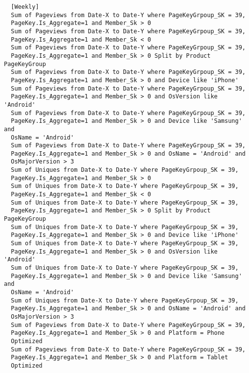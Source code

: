 \begin{verbatim}
  [Weekly]
  Sum of Pageviews from Date-X to Date-Y where PageKeyGrpoup_SK = 39,
  PageKey.Is_Aggregate=1 and Member_Sk > 0
  Sum of Pageviews from Date-X to Date-Y where PageKeyGrpoup_SK = 39,
  PageKey.Is_Aggregate=1 and Member_Sk < 0
  Sum of Pageviews from Date-X to Date-Y where PageKeyGrpoup_SK = 39,
  PageKey.Is_Aggregate=1 and Member_Sk > 0 Split by Product PageKeyGroup
  Sum of Pageviews from Date-X to Date-Y where PageKeyGrpoup_SK = 39,
  PageKey.Is_Aggregate=1 and Member_Sk > 0 and Device like 'iPhone'
  Sum of Pageviews from Date-X to Date-Y where PageKeyGrpoup_SK = 39,
  PageKey.Is_Aggregate=1 and Member_Sk > 0 and OsVersion like 'Android'
  Sum of Pageviews from Date-X to Date-Y where PageKeyGrpoup_SK = 39,
  PageKey.Is_Aggregate=1 and Member_Sk > 0 and Device like 'Samsung' and
  OsName = 'Android'
  Sum of Pageviews from Date-X to Date-Y where PageKeyGrpoup_SK = 39,
  PageKey.Is_Aggregate=1 and Member_Sk > 0 and OsName = 'Android' and
  OsMajorVersion > 3
  Sum of Uniques from Date-X to Date-Y where PageKeyGrpoup_SK = 39,
  PageKey.Is_Aggregate=1 and Member_Sk > 0
  Sum of Uniques from Date-X to Date-Y where PageKeyGrpoup_SK = 39,
  PageKey.Is_Aggregate=1 and Member_Sk < 0
  Sum of Uniques from Date-X to Date-Y where PageKeyGrpoup_SK = 39,
  PageKey.Is_Aggregate=1 and Member_Sk > 0 Split by Product PageKeyGroup
  Sum of Uniques from Date-X to Date-Y where PageKeyGrpoup_SK = 39,
  PageKey.Is_Aggregate=1 and Member_Sk > 0 and Device like 'iPhone'
  Sum of Uniques from Date-X to Date-Y where PageKeyGrpoup_SK = 39,
  PageKey.Is_Aggregate=1 and Member_Sk > 0 and OsVersion like 'Android'
  Sum of Uniques from Date-X to Date-Y where PageKeyGrpoup_SK = 39,
  PageKey.Is_Aggregate=1 and Member_Sk > 0 and Device like 'Samsung' and
  OsName = 'Android'
  Sum of Uniques from Date-X to Date-Y where PageKeyGrpoup_SK = 39,
  PageKey.Is_Aggregate=1 and Member_Sk > 0 and OsName = 'Android' and
  OsMajorVersion > 3
  Sum of Pageviews from Date-X to Date-Y where PageKeyGrpoup_SK = 39,
  PageKey.Is_Aggregate=1 and Member_Sk > 0 and Platform = Phone
  Optimized
  Sum of Pageviews from Date-X to Date-Y where PageKeyGrpoup_SK = 39,
  PageKey.Is_Aggregate=1 and Member_Sk > 0 and Platform = Tablet
  Optimized


\end{verbatim}
